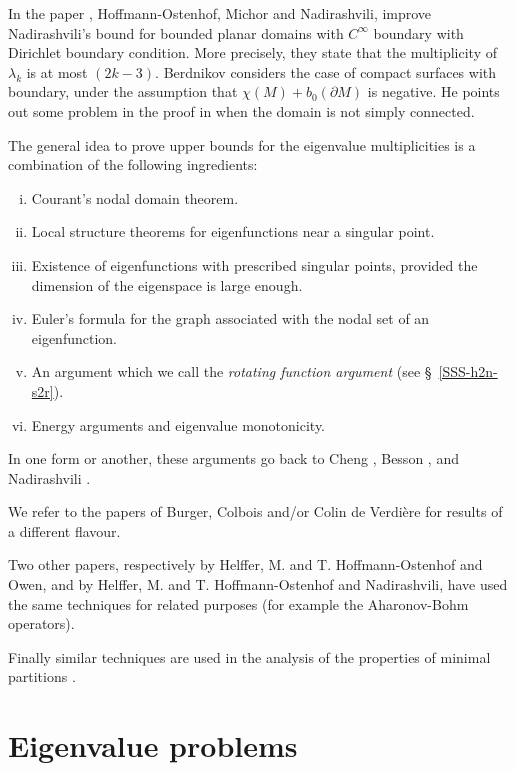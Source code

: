 \documentclass[12pt,a4paper]{amsart}
\theoremstyle{plain} %
\theoremstyle{definition}
\numberwithin{equation}{section}
\numberwithin{figure}{section}
\numberwithin{table}{section}
\begin{document}
In the paper \cite{HoMN1999}, Hoffmann-Ostenhof, Michor and Nadirashvili, improve Nadirashvili's bound for bounded planar domains  with $C^{\infty}$ boundary with Dirichlet boundary condition. More precisely, they state that the multiplicity of $\lambda_k$ is at most $(2k-3)$. Berdnikov \cite{Berd2018} considers the case of compact surfaces with boundary, under the assumption that $\chi(M) + b_0(\partial M)$ is negative.  He points out some problem in the proof in \cite{HoMN1999} when the domain is not simply connected.\medskip


The general idea to prove upper bounds for the eigenvalue multiplicities is a combination of the following ingredients:
\begin{enumerate}[(i)]
  \item Courant's nodal domain theorem.
  \item  Local structure theorems for eigenfunctions near a singular point.
  \item Existence of eigenfunctions with prescribed  singular points, provided the dimension of the eigenspace is large enough.
  \item Euler's formula for the graph associated with the nodal set of an eigenfunction.
  \item An argument which we call the \emph{rotating function argument} (see \S~\ref{SSS-h2n-s2r}).
  \item Energy arguments and eigenvalue monotonicity.
\end{enumerate}

In one form or another, these arguments go back to Cheng \cite{Chen1976}, Besson \cite{Bess1980}, and Nadirashvili \cite{Nadi1987}.\medskip


We refer to the papers of Burger, Colbois and/or Colin de Verdi\`{e}re \cite{BuCo1985, Colb1985, ColV1986, ColV1987, CoCo1988} for results of a different flavour. \smallskip


Two other papers,  respectively \cite{HeHO1999} by Helffer, M. and T. Hoffmann-Osten\-hof and Owen, and \cite{HeHN2002} by Helffer, M. and T. Hoffmann-Ostenhof and Nadirashvili, have used the same techniques
 for related purposes (for example the Aharo\-nov-Bohm  operators). \smallskip

Finally similar techniques are used in the analysis of the properties of minimal partitions \cite{HeHT2009,BoHe2017}.\medskip


\section{Eigenvalue problems}\label{S-evp}
\end{document}
